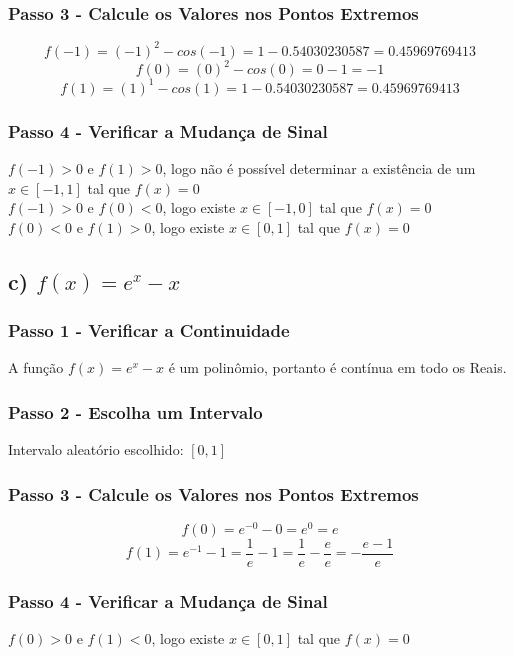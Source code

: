 \documentclass{article}
\begin{document}
    \subsubsection{Passo 3 - Calcule os Valores nos Pontos Extremos}
        \[
            f(-1) = (-1)^2 - cos(-1) = 1 - 0.54030230587 = 0.45969769413
        \]
        \[
            f(0) = (0)^2 - cos(0) = 0 - 1 = - 1
        \]
        \[
            f(1) = (1)^1 - cos(1) = 1 - 0.54030230587  = 0.45969769413
        \]

    \subsubsection{Passo 4 - Verificar a Mudança de Sinal}
        $f(-1) > 0$ e $f(1) > 0$, logo não é possível determinar a existência de um $x \in [-1,1]$ tal que $f(x) = 0$ \\
        $f(-1) > 0$ e $f(0) < 0$, logo existe $x \in [-1,0]$ tal que $f(x) = 0$ \\
        $f(0) < 0$ e $f(1) > 0$, logo existe $x \in [0,1]$ tal que $f(x) = 0$

\subsection{\texorpdfstring{c) $f(x) = e^x - x$}{c) f(x) = ex - x}}

    \subsubsection{Passo 1 - Verificar a Continuidade}
        A função $f(x) = e^x - x$ é um polinômio, portanto é contínua em todo os Reais.
    \subsubsection{Passo 2 - Escolha um Intervalo}
            Intervalo aleatório escolhido: $[0,1]$

    \subsubsection{Passo 3 - Calcule os Valores nos Pontos Extremos}
        \[
            f(0) = e^{-0} - 0 = e^0 = e
        \]
        \[
            f(1) = e^{-1} - 1 = \frac{1}{e} - 1 = \frac{1}{e} - \frac{e}{e} = -\frac{e-1}{e}
        \]

\subsubsection{Passo 4 - Verificar a Mudança de Sinal}
        $f(0) > 0$ e $f(1) < 0$, logo existe $x \in [0,1]$ tal que $f(x) = 0$
        
\end{document}
